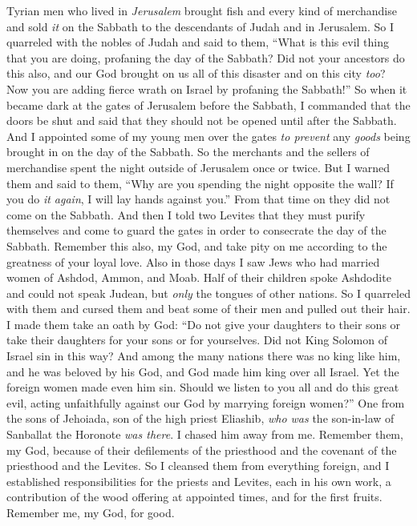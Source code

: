 \begin{biblechapter}
\verse Tyrian men who lived in \textit{Jerusalem} brought fish and every kind of merchandise and sold \textit{it} on the Sabbath to the descendants of Judah and in Jerusalem.
\verse So I quarreled with the nobles of Judah and said to them, “What is this evil thing that you are doing, profaning the day of the Sabbath?
\verse Did not your ancestors do this also, and our God brought on us all of this disaster and on this city \textit{too}? Now you are adding fierce wrath on Israel by profaning the Sabbath!”
\verse So when it became dark at the gates of Jerusalem before the Sabbath, I commanded that the doors be shut and said that they should not be opened until after the Sabbath. And I appointed some of my young men over the gates \textit{to prevent} any \textit{goods} being brought in on the day of the Sabbath.
\verse So the merchants and the sellers of merchandise spent the night outside of Jerusalem once or twice.
\verse But I warned them and said to them, “Why are you spending the night opposite the wall? If you do \textit{it again}, I will lay hands against you.” From that time on they did not come on the Sabbath.
\verse And then I told two Levites that they must purify themselves and come to guard the gates in order to consecrate the day of the Sabbath. Remember this also, my God, and take pity on me according to the greatness of your loyal love.
 Also in those days I saw Jews who had married women of Ashdod, Ammon, and Moab.
\verse Half of their children spoke Ashdodite and could not speak Judean, but \textit{only} the tongues of other nations.
\verse So I quarreled with them and cursed them and beat some of their men and pulled out their hair. I made them take an oath by God: “Do not give your daughters to their sons or take their daughters for your sons or for yourselves.
\verse Did not King Solomon of Israel sin in this way? And among the many nations there was no king like him, and he was beloved by his God, and God made him king over all Israel. Yet the foreign women made even him sin.
\verse Should we listen to you all and do this great evil, acting unfaithfully against our God by marrying foreign women?”
\verse One from the sons of Jehoiada, son of the high priest Eliashib, \textit{who was} the son-in-law of Sanballat the Horonote \textit{was there}. I chased him away from me.
\verse Remember them, my God, because of their defilements of the priesthood and the covenant of the priesthood and the Levites.
\verse So I cleansed them from everything foreign, and I established responsibilities for the priests and Levites, each in his own work,
\verse a contribution of the wood offering at appointed times, and for the first fruits. Remember me, my God, for good.
\end{biblechapter}

